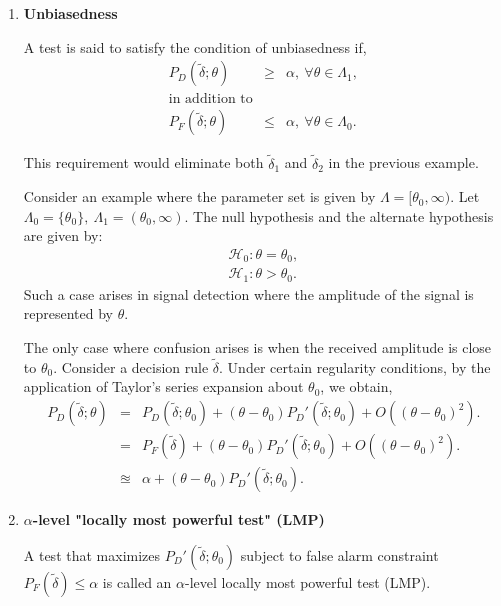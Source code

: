 \documentclass[a4paper,english,12pt]{article}
\begin{document}
\begin{enumerate}
\item \textbf{Unbiasedness}
\begin{defn}{A test is said to satisfy the condition of unbiasedness if,
\begin{eqnarray*} 
P_D(\tilde{ \delta};\theta)&\geq&\alpha,  ~ \forall  \theta \in  \Lambda_1, \\
\mbox{in addition to}\\
P_F(\tilde{\delta};\theta) &\leq& \alpha,  ~ \forall  \theta \in  \Lambda_0.
\end{eqnarray*}
}
\end{defn}	
This requirement would eliminate both $\tilde{\delta}_1$ and $\tilde{\delta}_2$ in the previous example.  
\begin{exmp} Consider an example where the parameter set is given by $\Lambda = [\theta_0,\infty).$ Let $\Lambda_0 = \{\theta_0\}, ~ \Lambda_1 = (\theta_0, \infty)$. The null hypothesis and the alternate hypothesis are given by:
\begin{eqnarray}
\mathcal{H}_0 : \theta = \theta_0, \\ 
\mathcal{H}_1 : \theta > \theta_0.
\end{eqnarray}
Such a case arises in signal detection where the amplitude of the signal is represented by $\theta$.
\par The only case where confusion arises is when the received amplitude is close to $\theta_0$. Consider a decision rule $\tilde{\delta}$. Under certain regularity conditions, by the application of Taylor's series expansion about $\theta_0$, we obtain,
\begin{eqnarray}
P_D(\tilde{ \delta};\theta) &=& P_D(\tilde{ \delta};\theta_0) + (\theta - \theta_0) P_{D}'(\tilde{ \delta};\theta_0) + O((\theta - \theta_0)^2). \nonumber \\
&=&P_F(\tilde{ \delta}) + (\theta - \theta_0) P_{D}'(\tilde{ \delta};\theta_0) + O((\theta - \theta_0)^2). \nonumber \\
&\approxeq& \alpha + (\theta - \theta_0) P_{D}'(\tilde{ \delta};\theta_0).
\end{eqnarray} 
\end{exmp}
\item \textbf{$\alpha$-level "locally most powerful test" (LMP)}
\par A test that maximizes $P_{D}'(\tilde{\delta};\theta_0)$ subject to false alarm constraint $P_F(\tilde{\delta}) \leq \alpha$ is called an $\alpha$-level locally most powerful test (LMP).
\begin{eqnarray}

\end{eqnarray}
\end{enumerate}
\end{document}
